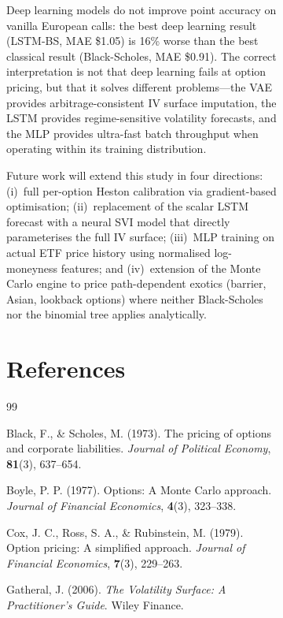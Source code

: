 \documentclass[12pt,a4paper]{article}
\begin{document}
\begin{figure}[H]
\begin{figure}[H]
Deep learning models do not improve point accuracy on vanilla European calls:
the best deep learning result (LSTM-BS, MAE \$1.05) is 16\% worse than the
best classical result (Black-Scholes, MAE \$0.91).
The correct interpretation is not that deep learning fails at option pricing,
but that it solves different problems---the VAE provides arbitrage-consistent
IV surface imputation, the LSTM provides regime-sensitive volatility forecasts,
and the MLP provides ultra-fast batch throughput when operating within its
training distribution.

Future work will extend this study in four directions:
(i)~full per-option Heston calibration via gradient-based optimisation;
(ii)~replacement of the scalar LSTM forecast with a neural SVI model that
directly parameterises the full IV surface;
(iii)~MLP training on actual ETF price history using normalised log-moneyness
features; and
(iv)~extension of the Monte Carlo engine to price path-dependent exotics
(barrier, Asian, lookback options) where neither Black-Scholes nor the binomial
tree applies analytically.

\section*{References}

\begingroup
\renewcommand{\section}[2]{}
\begin{thebibliography}{99}

  Black, F., \& Scholes, M. (1973).
  The pricing of options and corporate liabilities.
  \textit{Journal of Political Economy}, \textbf{81}(3), 637--654.

  Boyle, P. P. (1977).
  Options: A Monte Carlo approach.
  \textit{Journal of Financial Economics}, \textbf{4}(3), 323--338.

  Cox, J. C., Ross, S. A., \& Rubinstein, M. (1979).
  Option pricing: A simplified approach.
  \textit{Journal of Financial Economics}, \textbf{7}(3), 229--263.

  Gatheral, J. (2006).
  \textit{The Volatility Surface: A Practitioner's Guide}.
  Wiley Finance.


\end{thebibliography}
\end{figure}
\end{figure}
\end{document}
